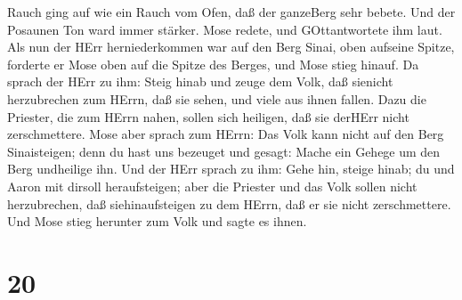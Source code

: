Rauch ging auf wie ein Rauch vom Ofen, daß der ganzeBerg sehr bebete.
 Und der Posaunen Ton ward immer stärker. Mose redete, und
GOttantwortete ihm laut.  Als nun der HErr herniederkommen
war auf den Berg Sinai, oben aufseine Spitze, forderte er Mose oben auf
die Spitze des Berges, und Mose stieg hinauf.  Da sprach
der HErr zu ihm: Steig hinab und zeuge dem Volk, daß sienicht
herzubrechen zum HErrn, daß sie sehen, und viele aus ihnen fallen.
 Dazu die Priester, die zum HErrn nahen, sollen sich
heiligen, daß sie derHErr nicht zerschmettere.  Mose aber
sprach zum HErrn: Das Volk kann nicht auf den Berg Sinaisteigen; denn du
hast uns bezeuget und gesagt: Mache ein Gehege um den Berg undheilige
ihn.  Und der HErr sprach zu ihm: Gehe hin, steige hinab;
du und Aaron mit dirsoll heraufsteigen; aber die Priester und das Volk
sollen nicht herzubrechen, daß siehinaufsteigen zu dem HErrn, daß er sie
nicht zerschmettere.  Und Mose stieg herunter zum Volk und
sagte es ihnen.

\hypertarget{section-19}{%
\section{20}\label{section-19}}


